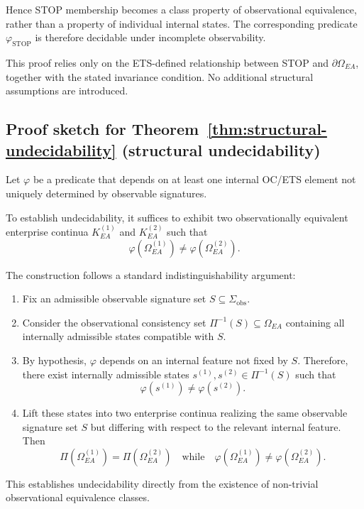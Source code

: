 Hence STOP membership becomes a class property of observational
equivalence, rather than a property of individual internal states.
The corresponding predicate $\varphi_{\mathrm{STOP}}$ is therefore
decidable under incomplete observability.

This proof relies only on the ETS-defined relationship between STOP and
$\partial\Omega_{EA}$, together with the stated invariance condition.
No additional structural assumptions are introduced.

\subsection{Proof sketch for Theorem~\ref{thm:structural-undecidability}
(structural undecidability)}

Let $\varphi$ be a predicate that depends on at least one internal
OC/ETS element not uniquely determined by observable signatures.

To establish undecidability, it suffices to exhibit two
observationally equivalent enterprise continua
$K_{EA}^{(1)}$ and $K_{EA}^{(2)}$ such that
\[
\varphi(\Omega_{EA}^{(1)}) \neq \varphi(\Omega_{EA}^{(2)}).
\]

The construction follows a standard indistinguishability argument:

\begin{enumerate}
\item Fix an admissible observable signature set
      $S \subseteq \Sigma_{\mathrm{obs}}$.
\item Consider the observational consistency set
      $\Pi^{-1}(S) \subseteq \Omega_{EA}$ containing all internally
      admissible states compatible with $S$.
\item By hypothesis, $\varphi$ depends on an internal feature not fixed
      by $S$. Therefore, there exist internally admissible states
      $s^{(1)}, s^{(2)} \in \Pi^{-1}(S)$ such that
      \[
      \varphi(s^{(1)}) \neq \varphi(s^{(2)}).
      \]
\item Lift these states into two enterprise continua realizing the same
      observable signature set $S$ but differing with respect to the
      relevant internal feature. Then
      \[
      \Pi(\Omega_{EA}^{(1)}) = \Pi(\Omega_{EA}^{(2)})
      \quad\text{while}\quad
      \varphi(\Omega_{EA}^{(1)}) \neq \varphi(\Omega_{EA}^{(2)}).
      \]
\end{enumerate}

This establishes undecidability directly from the existence of
non-trivial observational equivalence classes.


